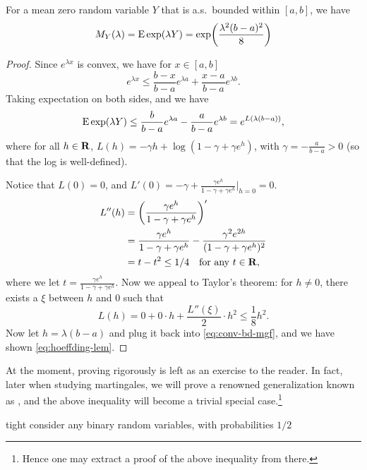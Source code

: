 \begin{namedthm} \label{lem:Hoeffding}
    For a mean zero random variable $Y$ that is a.s.\ bounded within $[a,b]$, we have \begin{equation}\label{eq:hoeffding-lem}
        M_Y(\lambda) = \E\exp(\lambda Y) = \exp\biggl(\frac{\lambda^2 (b - a)^2}{8}\biggr)
    \end{equation}
\end{namedthm}
\begin{proof}
Since $e^{\lambda x}$ is convex, we have for $x \in [a,b]$ \[
e^{\lambda x} \leq \frac{b-x}{b-a}e^{\lambda a} + \frac{x-a}{b-a}e^{\lambda b}.
\]
Taking expectation on both sides, and we have \begin{equation}
\E \exp(\lambda Y) \leq \frac{b}{b-a} e^{\lambda a} - \frac{a}{b-a} e^{\lambda b} = e^{L(\lambda(b-a))}, \label{eq:conv-bd-mgf}
\end{equation}
where for all $h \in \mathbf{R}$, $L(h) = - \gamma h + \log(1 - \gamma + \gamma e^h)$, with $\gamma = -\frac{a}{b - a} > 0$ (so that the log is well-defined).

Notice that $L(0) = 0$, and $L'(0) = -\gamma + \frac{\gamma e^h}{1 - \gamma + \gamma e^h}\big\vert_{h = 0} = 0$. \begin{align*}
L''(h) & = \biggl(\frac{\gamma e^h}{1 - \gamma + \gamma e^h}\biggr)' \\
& = \frac{\gamma e^h}{1 - \gamma + \gamma e^h} - \frac{\gamma^2 e^{2h}}{(1 - \gamma + \gamma e^h)^2} \\
& = t - t^2 \leq 1/4\quad \text{for any }t\in \mathbf{R}, 
\end{align*}
where we let $t = \frac{\gamma e^h}{1 - \gamma + \gamma e^h}$. Now we appeal to Taylor's theorem: for $h \neq 0$, there exists a $\xi$ between $h$ and 0 such that \[L(h) = 0 + 0\cdot h + \frac{L''(\xi)}{2} \cdot h^2 \leq \frac{1}{8} h^2.\] Now let $h = \lambda(b-a)$ and plug it back into \eqref{eq:conv-bd-mgf}, and we have shown \eqref{eq:hoeffding-lem}.    
\end{proof}

At the moment, proving  rigorously is left as an exercise to the reader. In fact, later when studying martingales, we will prove a renowned generalization known as , and the above inequality will become a trivial special case.\footnote{Hence one may extract a proof of the above inequality from there.}

tight consider any binary random variables, with probabilities $1/2$



